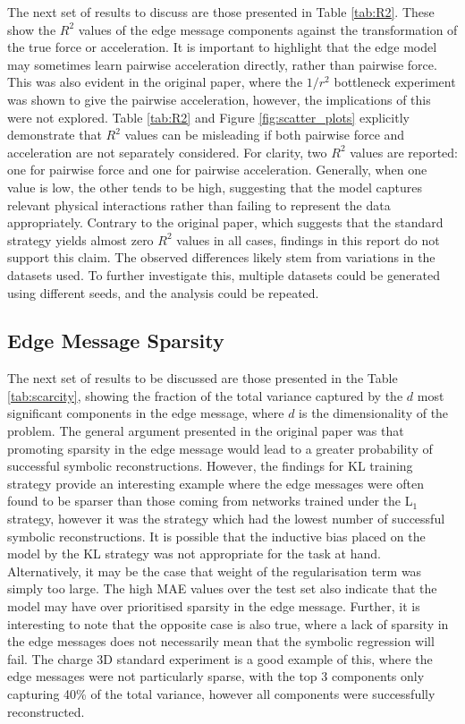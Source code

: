 \documentclass[11pt]{article}
\begin{document}
The next set of results to discuss are those presented in Table \ref{tab:R2}. These show the $R^2$ values of the edge message components against the transformation of the true force or acceleration. It is important to highlight that the edge model may sometimes learn pairwise acceleration directly, rather than pairwise force. This was also evident in the original paper, where the $1/r^2$ bottleneck experiment was shown to give the pairwise acceleration, however, the implications of this were not explored. Table \ref{tab:R2} and Figure \ref{fig:scatter_plots} explicitly demonstrate that $R^2$ values can be misleading if both pairwise force and acceleration are not separately considered. For clarity, two $R^2$ values are reported: one for pairwise force and one for pairwise acceleration. Generally, when one value is low, the other tends to be high, suggesting that the model captures relevant physical interactions rather than failing to represent the data appropriately. Contrary to the original paper, which suggests that the standard strategy yields almost zero $R^2$ values in all cases, findings in this report do not support this claim. The observed differences likely stem from variations in the datasets used. To further investigate this, multiple datasets could be generated using different seeds, and the analysis could be repeated.


\subsection{Edge Message Sparsity}
The next set of results to be discussed are those presented in the Table \ref{tab:scarcity}, showing the fraction of the total variance captured by the $d$ most significant components in the edge message, where $d$ is the dimensionality of the problem. The general argument presented in the original paper was that promoting sparsity in the edge message would lead to a greater probability of successful symbolic reconstructions. However, the findings for KL training strategy provide an interesting example where the edge messages were often found to be sparser than those coming from networks trained under the L$_{1}$ strategy, however it was the strategy which had the lowest number of successful symbolic reconstructions. It is possible that the inductive bias placed on the model by the KL strategy was not appropriate for the task at hand. Alternatively, it may be the case that weight of the regularisation term was simply too large. The high MAE values over the test set also indicate that the model may have over prioritised sparsity in the edge message. Further, it is interesting to note that the opposite case is also true, where a lack of sparsity in the edge messages does not necessarily mean that the symbolic regression will fail. The charge 3D standard experiment is a good example of this, where the edge messages were not particularly sparse, with the top 3 components only capturing 40\% of the total variance, however all components were successfully reconstructed.
\end{document}
